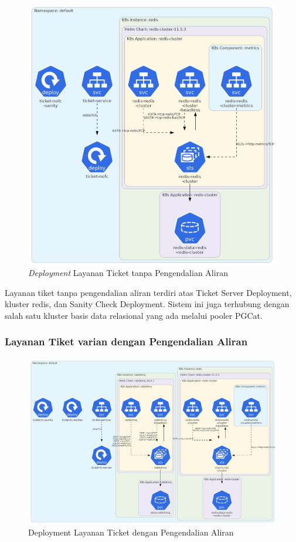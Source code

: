 \begin{figure}[htbp]
    \centering
    \includegraphics[width=1\textwidth]{resources/chapter-4/ticket-nofc.png}
    \caption{\textit{Deployment} Layanan Ticket tanpa Pengendalian Aliran}
    \label{fig:deployment-ticket-nofc}
\end{figure}

Layanan tiket tanpa pengendalian aliran terdiri atas Ticket Server Deployment, kluster redis, dan Sanity Check Deployment. Sistem ini juga terhubung dengan salah satu kluster basis data relasional yang ada melalui pooler PGCat.

\pagebreak

\subsubsection{Layanan Tiket varian dengan Pengendalian Aliran}

\begin{figure}[htbp]
    \centering
    \includegraphics[width=1\textwidth]{resources/chapter-4/ticket-fc.png}
    \caption{Deployment Layanan Ticket dengan Pengendalian Aliran}
    \label{fig:deployment-ticket-fc}
\end{figure}

